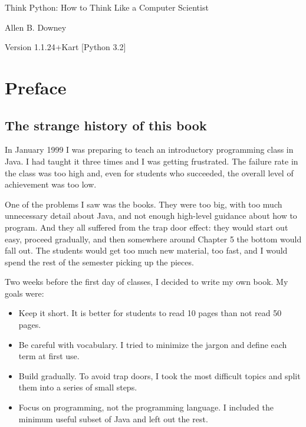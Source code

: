 \documentclass[10pt]{book}
\newcommand{\thetitle}{Think Python: How to Think Like a Computer Scientist}
\newcommand{\theversion}{1.1.24+Kart [Python 3.2]}
\begin{document}

\begin{htmlonly}


{\Large \thetitle}

{\large Allen B. Downey}

Version \theversion

\setcounter{chapter}{-1}

\end{htmlonly}

\chapter{Preface}

\section*{The strange history of this book}

In January 1999 I was preparing to teach an introductory programming
class in Java.  I had taught it three times and I was getting
frustrated.  The failure rate in the class was too high and, even for
students who succeeded, the overall level of achievement was too low.

One of the problems I saw was the books.  
They were too big, with too much unnecessary detail about Java, and
not enough high-level guidance about how to program.  And they all
suffered from the trap door effect: they would start out easy,
proceed gradually, and then somewhere around Chapter 5 the bottom would
fall out.  The students would get too much new material, too fast,
and I would spend the rest of the semester picking up the pieces.

Two weeks before the first day of classes, I decided to write my
own book.  
My goals were:

\begin{itemize}

\item Keep it short.  It is better for students to read 10 pages
than not read 50 pages.

\item Be careful with vocabulary.  I tried to minimize the jargon
and define each term at first use.

\item Build gradually. To avoid trap doors, I took the most difficult
topics and split them into a series of small steps. 

\item Focus on programming, not the programming language.  I included
the minimum useful subset of Java and left out the rest.

\end{itemize}
\end{document}

